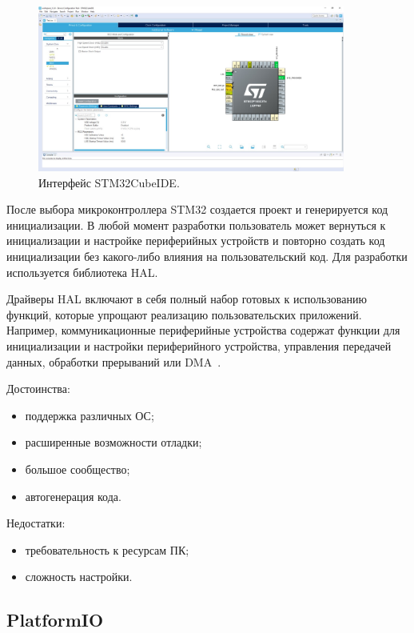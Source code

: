 	\begin{figure}[h]
    \centering
    \includegraphics[width=0.9\textwidth]{../image/cube.jpg}
    \caption{Интерфейс STM32CubeIDE.}
	\end{figure}
	
	После выбора микроконтроллера STM32 создается проект и генерируется код инициализации. В любой момент разработки пользователь может вернуться к инициализации и настройке периферийных устройств и повторно создать код инициализации без какого-либо влияния на пользовательский код. Для разработки используется библиотека HAL. 
	
	Драйверы HAL включают в себя полный набор готовых к использованию функций, которые упрощают реализацию пользовательских приложений. Например, коммуникационные периферийные устройства содержат функции для инициализации и настройки периферийного устройства, управления передачей данных, обработки прерываний или DMA~\cite{hal}.
	
	Достоинства:
	\begin{itemize}
		\item поддержка различных ОС;
		\item расширенные возможности отладки;
		\item большое сообщество;
		\item автогенерация кода.
	\end{itemize}
	
	Недостатки:
	\begin{itemize}
		\item требовательность к ресурсам ПК;
		\item сложность настройки.
	\end{itemize}

\subsection{PlatformIO}

